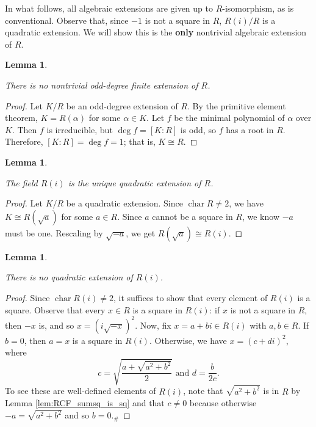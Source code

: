 \documentclass{article}
\newtheorem{lemma}[theorem]{Lemma}
\newcommand{\ch}{\operatorname{char}}
\newcommand{\leanok}{}
\newcommand{\lean}[1]{}
\newcommand{\uses}[1]{}
\begin{document}
In what follows, all algebraic extensions are given up to $R$-isomorphism, as is conventional. Observe that, since $-1$ is not a square in $R$, $R(i)/R$ is a quadratic extension. We will show this is the \textbf{only} nontrivial algebraic extension of $R$.

\begin{lemma}
  \label{lem:alg_ext_odd_deg}
  \uses{def:RCF}
  \lean{IsRealClosed.finrank_eq_one_of_odd_finrank}
  \leanok
  There is no nontrivial odd-degree finite extension of $R$.
\end{lemma}
\begin{proof}
  \leanok
  Let $K/R$ be an odd-degree extension of $R$. By the primitive element theorem, $K=R(\alpha)$ for some $\alpha\in K$. Let $f$ be the minimal polynomial of $\alpha$ over $K$. Then $f$ is irreducible, but $\deg f=[K:R]$ is odd, so $f$ has a root in $R$. Therefore, $[K:R]=\deg f=1$; that is, $K\cong R$.
\end{proof}

\begin{lemma}
  \label{lem:ext_deg_2}
  \uses{def:RCF}
  \lean{IsRealClosed.nonempty_algEquiv_Ri_of_finrank_eq_two}
  \leanok
  The field $R(i)$ is the unique quadratic extension of $R$.
\end{lemma}
\begin{proof}
  \leanok
  Let $K/R$ be a quadratic extension. Since $\ch R\neq2$, we have $K\cong R(\sqrt{a})$ for some $a\in R$. Since $a$ cannot be a square in $R$, we know $-a$ must be one. Rescaling by $\sqrt{-a}$, we get $R(\sqrt{a})\cong R(i)$.
\end{proof}

\begin{lemma}
  \label{lem:Ri_ext_deg_2}
  \uses{def:RCF}
  \lean{IsRealClosed.no_quadratic_ext_Ri}
  \leanok
  There is no quadratic extension of $R(i)$.
\end{lemma}
\begin{proof}
  \uses{lem:RCF_sumsq_is_sq}
  \leanok
  Since $\operatorname{char}R(i)\neq 2$, it suffices to show that every element of $R(i)$ is a square. Observe that every $x\in R$ is a square in $R(i)$: if $x$ is not a square in $R$, then $-x$ is, and so $x=(i\sqrt{-x})^2$. Now, fix $x=a+bi\in R(i)$ with $a,b\in R$. If $b=0$, then $a=x$ is a square in $R(i)$. Otherwise, we have $x=(c+di)^2$, where
  \[c=\sqrt{\frac{a+\sqrt{a^2+b^2}}{2}}\text{ and }d=\frac{b}{2c}.\]
  To see these are well-defined elements of $R(i)$, note that $\sqrt{a^2+b^2}$ is in $R$ by Lemma \ref{lem:RCF_sumsq_is_sq} and that $c\neq0$ because otherwise $-a=\sqrt{a^2+b^2}$ and so $b=0$.$_\#$
\end{proof}
\end{document}
